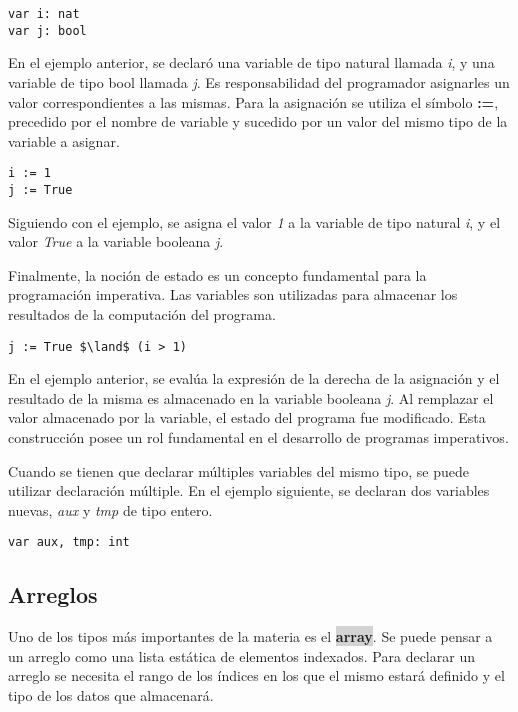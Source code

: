 \documentclass{article}
\newcommand{\type}[1]{\colorbox{lightgray}{\textbf{#1}}}
\begin{document}
\begin{lstlisting}
var i: nat
var j: bool
\end{lstlisting}{}

En el ejemplo anterior, se declaró una variable de tipo natural llamada \textit{i}, y una variable de tipo bool llamada \textit{j}.
Es responsabilidad del programador asignarles un valor correspondientes a las mismas.
Para la asignación se utiliza el símbolo \textbf{:=}, precedido por el nombre de variable y sucedido por un valor del mismo tipo de la variable a asignar.

\begin{lstlisting}
i := 1
j := True
\end{lstlisting}

Siguiendo con el ejemplo, se asigna el valor \textit{1} a la variable de tipo natural \textit{i}, y el valor \textit{True} a la variable booleana \textit{j}.

Finalmente, la noción de estado es un concepto fundamental para la programación imperativa.
Las variables son utilizadas para almacenar los resultados de la computación del programa.

\begin{lstlisting}
j := True $\land$ (i > 1)
\end{lstlisting}

En el ejemplo anterior, se evalúa la expresión de la derecha de la asignación y el resultado de la misma es almacenado en la variable booleana \textit{j}.
Al remplazar el valor almacenado por la variable, el estado del programa fue modificado.
Esta construcción posee un rol fundamental en el desarrollo de programas imperativos.

Cuando se tienen que declarar múltiples variables del mismo tipo, se puede utilizar declaración múltiple.
En el ejemplo siguiente, se declaran dos variables nuevas, \textit{aux} y \textit{tmp} de tipo entero.

\begin{lstlisting}
var aux, tmp: int
\end{lstlisting}

\subsection{Arreglos}
Uno de los tipos más importantes de la materia es el \type{array}.
Se puede pensar a un arreglo como una lista estática de elementos indexados.
Para declarar un arreglo se necesita el rango de los índices en los que el mismo estará definido y el tipo de los datos que almacenará.
\end{document}
